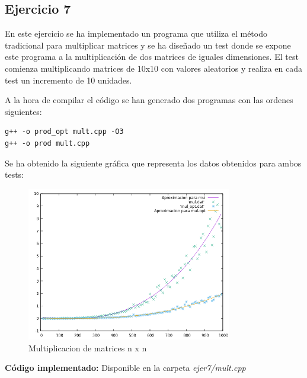 \subsection*{Ejercicio 7}


\begin{flushleft}
  En este ejercicio se ha implementado un programa que utiliza el
  método tradicional para multiplicar matrices y se ha diseñado un
  test donde se expone este programa a la multiplicación de dos
  matrices de iguales dimensiones. El test comienza multiplicando
  matrices de 10x10 con valores aleatorios y realiza en cada test un
  incremento de 10 unidades.
\end{flushleft}

\begin{flushleft}
  A la hora de compilar el código se han generado dos programas con las ordenes siguientes:
\end{flushleft}

\begin{verbatim}
g++ -o prod_opt mult.cpp -O3
g++ -o prod mult.cpp
\end{verbatim}

\begin{flushleft}
  Se ha obtenido la siguiente gráfica que representa los datos obtenidos para ambos tests:
\end{flushleft}

\begin{figure}[H]
  \caption{Multiplicacion de matrices n x n}
  \centering
  \includegraphics[width=0.8\textwidth]{ejer7/comparacion.png}
\end{figure}

\textbf{Código implementado:} Disponible en la carpeta \textit{ejer7/mult.cpp}